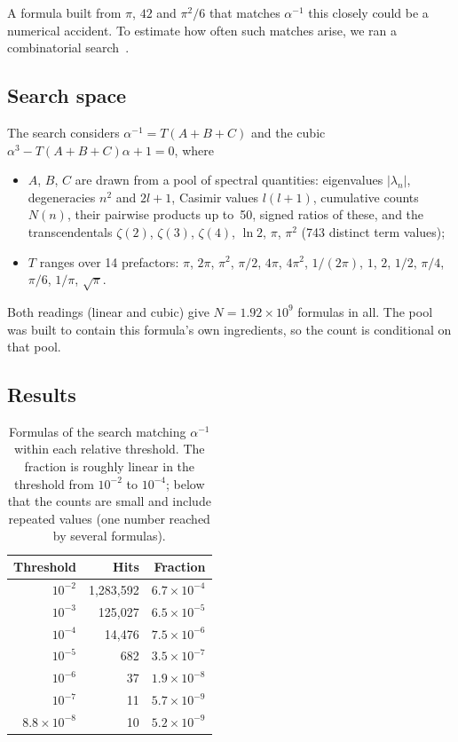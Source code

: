 \documentclass[aps,prl,twocolumn,superscriptaddress]{revtex4-2}
\begin{document}
A formula built from $\pi$, $42$ and $\pi^2/6$ that matches $\alpha^{-1}$
this closely could be a numerical accident. To estimate how often such
matches arise, we ran a combinatorial search~\cite{phase2_audit}.

\subsection{Search space}

The search considers $\alpha^{-1} = T(A + B + C)$ and the cubic
$\alpha^3 - T(A+B+C)\alpha + 1 = 0$, where
\begin{itemize}
\item $A$, $B$, $C$ are drawn from a pool of spectral quantities:
  eigenvalues $|\lambda_n|$, degeneracies $n^2$ and $2l+1$, Casimir
  values $l(l+1)$, cumulative counts $N(n)$, their pairwise products
  up to~50, signed ratios of these, and the transcendentals $\zeta(2)$,
  $\zeta(3)$, $\zeta(4)$, $\ln 2$, $\pi$, $\pi^2$ (743 distinct term
  values);
\item $T$ ranges over 14 prefactors: $\pi$, $2\pi$, $\pi^2$, $\pi/2$,
  $4\pi$, $4\pi^2$, $1/(2\pi)$, $1$, $2$, $1/2$, $\pi/4$, $\pi/6$,
  $1/\pi$, $\sqrt{\pi}$.
\end{itemize}
Both readings (linear and cubic) give $N = 1.92\times10^9$ formulas in
all. The pool was built to contain this formula's own ingredients, so
the count is conditional on that pool.

\subsection{Results}

\begin{table}[tb]
\centering
\begin{tabular}{rrr}
\hline\hline
Threshold & Hits & Fraction \\
\hline
$10^{-2}$          & 1{,}283{,}592  & $6.7 \times 10^{-4}$ \\
$10^{-3}$          &   125{,}027    & $6.5 \times 10^{-5}$ \\
$10^{-4}$          &    14{,}476    & $7.5 \times 10^{-6}$ \\
$10^{-5}$          &       682      & $3.5 \times 10^{-7}$ \\
$10^{-6}$          &        37      & $1.9 \times 10^{-8}$ \\
$10^{-7}$          &        11      & $5.7 \times 10^{-9}$ \\
$8.8\times 10^{-8}$ &       10      & $5.2 \times 10^{-9}$ \\
\hline\hline
\end{tabular}
\caption{Formulas of the search matching $\alpha^{-1}$ within each
relative threshold. The fraction is roughly linear in the threshold
from $10^{-2}$ to $10^{-4}$; below that the counts are small and include
repeated values (one number reached by several formulas).}
\label{tab:hits}
\end{table}
\end{document}
